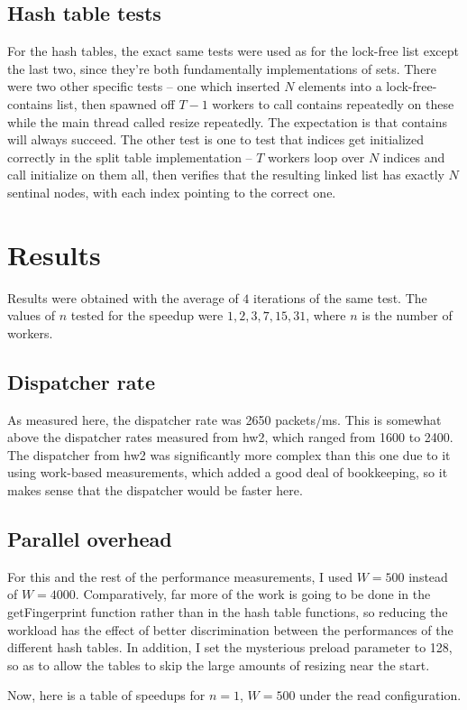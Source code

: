 \documentclass{article}
\begin{document}
\subsection*{Hash table tests}
For the hash tables, the exact same tests were used as for the lock-free list except the last two, since they're both fundamentally implementations of sets. There were two other specific tests -- one which inserted $N$ elements into a lock-free-contains list, then spawned off $T-1$ workers to call contains repeatedly on these while the main thread called resize repeatedly. The expectation is that contains will always succeed. The other test is one to test that indices get initialized correctly in the split table implementation -- $T$ workers loop over $N$ indices and call initialize on them all, then verifies that the resulting linked list has exactly $N$ sentinal nodes, with each index pointing to the correct one.
\section*{Results}
Results were obtained with the average of $4$ iterations of the same test. The values of $n$ tested for the speedup were $1,2,3,7,15,31$, where $n$ is the number of workers.
\subsection*{Dispatcher rate}
As measured here, the dispatcher rate was 2650 packets/ms. This is somewhat above the dispatcher rates measured from hw2, which ranged from 1600 to 2400. The dispatcher from hw2 was significantly more complex than this one due to it using work-based measurements, which added a good deal of bookkeeping, so it makes sense that the dispatcher would be faster here.
\subsection*{Parallel overhead}
For this and the rest of the performance measurements, I used $W=500$ instead of $W=4000$. Comparatively, far more of the work is going to be done in the getFingerprint function rather than in the hash table functions, so reducing the workload has the effect of better discrimination between the performances of the different hash tables. In addition, I set the mysterious preload parameter to 128, so as to allow the tables to skip the large amounts of resizing near the start.

Now, here is a table of speedups for $n=1$, $W=500$ under the read configuration.
\end{document}
